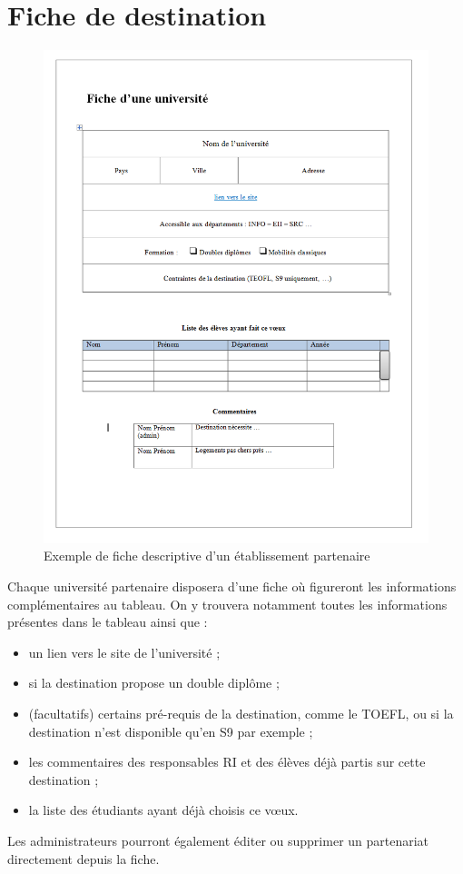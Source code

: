  \section{Fiche de destination}
 \label{sec::sheet_univ}
 
 \begin{figure}[H]
 	\centerline{\includegraphics[scale=0.5]{Universites/ficheUniv.png}}
 	\caption{Exemple de fiche descriptive d'un établissement partenaire}
 \end{figure}
 
 Chaque université partenaire disposera d'une fiche où figureront les informations complémentaires au tableau.
 On y trouvera notamment toutes les informations présentes dans le tableau ainsi que :
 \begin{itemize}
 	\item un lien vers le site de l'université ;
 	\item si la destination propose un double diplôme ;
 	\item (facultatifs) certains pré-requis de la destination, comme le TOEFL, ou si la destination n'est disponible qu'en S9 par exemple ;
 	\item les commentaires des responsables RI et des élèves déjà partis sur cette destination ;
 	\item la liste des étudiants ayant déjà choisis ce vœux.
 \end{itemize}
 

 
 Les administrateurs pourront également éditer ou supprimer un partenariat directement depuis la fiche.